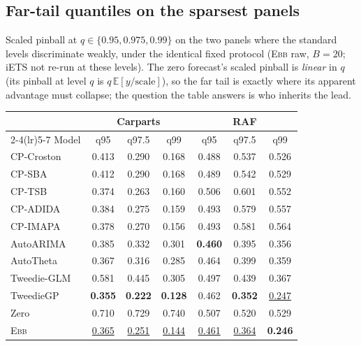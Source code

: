\documentclass[twoside]{article}
\theoremstyle{definition}
\newcommand{\EBB}{\textsc{Ebb}}
\newcommand{\E}{\mathbb{E}}
\newcommand{\best}[1]{\textbf{#1}}
\newcommand{\secondbest}[1]{\underline{#1}}
\begin{document}
\subsection{Far-tail quantiles on the sparsest panels}
\label{app:fartail}

Scaled pinball at $q\in\{0.95,0.975,0.99\}$ on the two panels where the
standard levels discriminate weakly, under the identical fixed protocol
(\EBB{} raw, $B{=}20$; iETS not re-run at these levels). The zero
forecast's scaled pinball is \emph{linear} in $q$ (its pinball at level
$q$ is $q\,\E[y/\mathrm{scale}]$), so the far tail is exactly where its
apparent advantage must collapse; the question the table answers is who
inherits the lead.

\begin{table}[h]
\centering
\small
\setlength{\tabcolsep}{3.6pt}
\begin{tabular}{lccc@{\hspace{10pt}}ccc}
\toprule
 & \multicolumn{3}{c}{Carparts} & \multicolumn{3}{c}{RAF}\\
\cmidrule(lr){2-4}\cmidrule(lr){5-7}
Model & q95 & q97.5 & q99 & q95 & q97.5 & q99\\
\midrule
CP-Croston & 0.413 & 0.290 & 0.168 & 0.488 & 0.537 & 0.526\\
CP-SBA & 0.412 & 0.290 & 0.168 & 0.489 & 0.542 & 0.529\\
CP-TSB & 0.374 & 0.263 & 0.160 & 0.506 & 0.601 & 0.552\\
CP-ADIDA & 0.384 & 0.275 & 0.159 & 0.493 & 0.579 & 0.557\\
CP-IMAPA & 0.378 & 0.270 & 0.156 & 0.493 & 0.581 & 0.564\\
AutoARIMA & 0.385 & 0.332 & 0.301 & \best{0.460} & 0.395 & 0.356\\
AutoTheta & 0.367 & 0.316 & 0.285 & 0.464 & 0.399 & 0.359\\
Tweedie-GLM & 0.581 & 0.445 & 0.305 & 0.497 & 0.439 & 0.367\\
TweedieGP & \best{0.355} & \best{0.222} & \best{0.128} & 0.462 & \best{0.352} & \secondbest{0.247}\\
\midrule
Zero & 0.710 & 0.729 & 0.740 & 0.507 & 0.520 & 0.529\\
\midrule
\EBB{} & \secondbest{0.365} & \secondbest{0.251} & \secondbest{0.144} & \secondbest{0.461} & \secondbest{0.364} & \best{0.246}\\
\bottomrule
\end{tabular}
\end{table}
\end{document}
